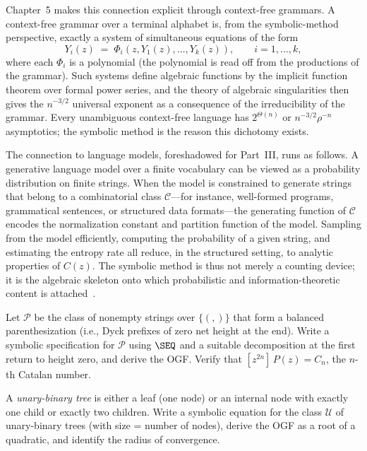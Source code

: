 Chapter~5 makes this connection explicit through context-free grammars.  A
context-free grammar over a terminal alphabet is, from the symbolic-method
perspective, exactly a system of simultaneous equations of the form
\[
  Y_i(z) \;=\; \Phi_i(z, Y_1(z), \ldots, Y_k(z)), \qquad i = 1, \ldots, k,
\]
where each $\Phi_i$ is a polynomial (the polynomial is read off from the
productions of the grammar).  Such systems define algebraic functions by the
implicit function theorem over formal power series, and the theory of algebraic
singularities then gives the $n^{-3/2}$ universal exponent as a consequence of
the irreducibility of the grammar.  Every unambiguous context-free language has
$2^{\Theta(n)}$ or $n^{-3/2} \rho^{-n}$ asymptotics; the symbolic method is the
reason this dichotomy exists.

The connection to language models, foreshadowed for Part~III, runs as follows.  A
generative language model over a finite vocabulary can be viewed as a probability
distribution on finite strings.  When the model is constrained to generate strings
that belong to a combinatorial class $\mathcal{C}$---for instance, well-formed
programs, grammatical sentences, or structured data formats---the generating
function of $\mathcal{C}$ encodes the normalization constant and partition function
of the model.  Sampling from the model efficiently, computing the probability of a
given string, and estimating the entropy rate all reduce, in the structured setting,
to analytic properties of $C(z)$.  The symbolic method is thus not merely a
counting device; it is the algebraic skeleton onto which probabilistic and
information-theoretic content is attached~\cite{FlajoletSedgewick2009}.

\begin{exercise}
Let $\mathcal{P}$ be the class of nonempty strings over $\{(, )\}$ that form a
balanced parenthesization (i.e., Dyck prefixes of zero net height at the end).
Write a symbolic specification for $\mathcal{P}$ using $\SEQ$ and a suitable
decomposition at the first return to height zero, and derive the OGF.  Verify that
$[z^{2n}]\,P(z) = C_n$, the $n$-th Catalan number.
\end{exercise}

\begin{exercise}
A \emph{unary-binary tree} is either a leaf (one node) or an internal node with
exactly one child or exactly two children.  Write a symbolic equation for the class
$\mathcal{U}$ of unary-binary trees (with size = number of nodes), derive the OGF
as a root of a quadratic, and identify the radius of convergence.
\end{exercise}

